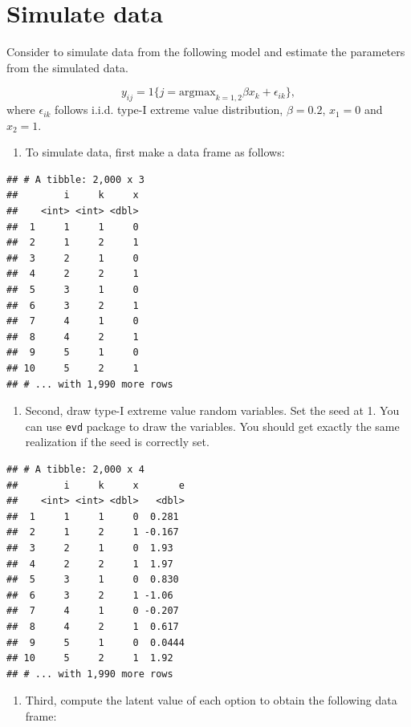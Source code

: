\documentclass[
]{book}
\providecommand{\tightlist}{%
  \setlength{\itemsep}{0pt}\setlength{\parskip}{0pt}}
\begin{document}
\hypertarget{simulate-data}{%
\section{Simulate data}\label{simulate-data}}

Consider to simulate data from the following model and estimate the parameters from the simulated data.

\[
y_{ij} = 1\{j = \text{argmax}_{k = 1, 2} \beta x_k + \epsilon_{ik} \},
\]
where \(\epsilon_{ik}\) follows i.i.d. type-I extreme value distribution, \(\beta = 0.2\), \(x_1 = 0\) and \(x_2 = 1\).

\begin{enumerate}
\def\labelenumi{\arabic{enumi}.}
\tightlist
\item
  To simulate data, first make a data frame as follows:
\end{enumerate}

\begin{verbatim}
## # A tibble: 2,000 x 3
##        i     k     x
##    <int> <int> <dbl>
##  1     1     1     0
##  2     1     2     1
##  3     2     1     0
##  4     2     2     1
##  5     3     1     0
##  6     3     2     1
##  7     4     1     0
##  8     4     2     1
##  9     5     1     0
## 10     5     2     1
## # ... with 1,990 more rows
\end{verbatim}

\begin{enumerate}
\def\labelenumi{\arabic{enumi}.}
\setcounter{enumi}{1}
\tightlist
\item
  Second, draw type-I extreme value random variables. Set the seed at 1. You can use \texttt{evd} package to draw the variables. You should get exactly the same realization if the seed is correctly set.
\end{enumerate}

\begin{verbatim}
## # A tibble: 2,000 x 4
##        i     k     x       e
##    <int> <int> <dbl>   <dbl>
##  1     1     1     0  0.281 
##  2     1     2     1 -0.167 
##  3     2     1     0  1.93  
##  4     2     2     1  1.97  
##  5     3     1     0  0.830 
##  6     3     2     1 -1.06  
##  7     4     1     0 -0.207 
##  8     4     2     1  0.617 
##  9     5     1     0  0.0444
## 10     5     2     1  1.92  
## # ... with 1,990 more rows
\end{verbatim}

\begin{enumerate}
\def\labelenumi{\arabic{enumi}.}
\setcounter{enumi}{2}
\tightlist
\item
  Third, compute the latent value of each option to obtain the following data frame:
\end{enumerate}
\end{document}
